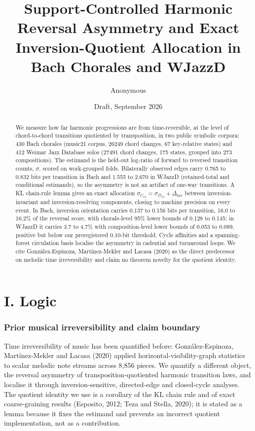 \documentclass[11pt]{article}
\title{Support-Controlled Harmonic Reversal Asymmetry and Exact Inversion-Quotient Allocation in Bach Chorales and WJazzD}
\author{Anonymous}\date{Draft, September 2026}
\begin{document}
\maketitle
\begin{abstract}
We measure how far harmonic progressions are from time-reversible, at the level of chord-to-chord transitions quotiented by transposition, in two public symbolic corpora: 430 Bach chorales (music21 corpus, 26249 chord changes, 67 key-relative states) and 412 Weimar Jazz Database solos (27491 chord changes, 175 states, grouped into 273 compositions). The estimand is the held-out log-ratio of forward to reversed transition counts, $\sigma$, scored on work-grouped folds. Bilaterally observed edges carry 0.765 to 0.832 bits per transition in Bach and 1.555 to 2.670 in WJazzD (retained-total and conditional estimands), so the asymmetry is not an artifact of one-way transitions. A KL chain-rule lemma gives an exact allocation $\sigma_{C_{12}}=\sigma_{D_{12}}+\Delta_{\mathrm{inv}}$ between inversion-invariant and inversion-resolving components, closing to machine precision on every event. In Bach, inversion orientation carries 0.137 to 0.156 bits per transition, 16.0 to 16.2\% of the reversal score, with chorale-level 95\% lower bounds of 0.128 to 0.145; in WJazzD it carries 3.7 to 4.7\% with composition-level lower bounds of 0.053 to 0.089, positive but below our preregistered 0.10-bit threshold. Cycle affinities and a spanning-forest circulation basis localise the asymmetry in cadential and turnaround loops. We cite Gonz\'alez-Espinoza, Mart\'inez-Mekler and Lacasa (2020) as the direct predecessor on melodic time irreversibility and claim no theorem novelty for the quotient identity.
\end{abstract}

\part*{I. Logic}
\section{Prior musical irreversibility and claim boundary}
Time irreversibility of music has been quantified before: Gonz\'alez-Espinoza, Mart\'inez-Mekler and Lacasa (2020) applied horizontal-visibility-graph statistics to scalar melodic note streams across 8{,}856 pieces. We quantify a different object, the reversal asymmetry of transposition-quotiented harmonic transition laws, and localise it through inversion-sensitive, directed-edge and closed-cycle analyses. The quotient identity we use is a corollary of the KL chain rule and of exact coarse-graining results (Esposito, 2012; Teza and Stella, 2020); it is stated as a lemma because it fixes the estimand and prevents an incorrect quotient implementation, not as a contribution.
\end{document}
